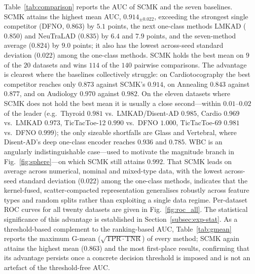 \documentclass[times, review, 10pt]{elsarticle}
\begin{document}
Table~\ref{tab:comparison} reports the AUC of SCMK and the seven baselines. SCMK
attains the highest mean AUC, $0.914_{\pm0.022}$, exceeding the strongest single
competitor (DFNO, $0.863$) by $5.1$ points, the next one-class
methods LMKAD ($0.850$) and NeuTraLAD ($0.835$) by $6.4$ and $7.9$ points, and the
seven-method average ($0.824$) by $9.0$ points; it also has the lowest
across-seed standard deviation ($0.022$) among the one-class methods. SCMK holds
the best mean on $9$ of the $20$ datasets and wins $114$ of the $140$ pairwise
comparisons. The advantage is clearest where the baselines collectively struggle:
on Cardiotocography the best competitor reaches only $0.873$ against SCMK's $0.914$,
on Annealing $0.843$ against $0.877$, and on Audiology $0.970$ against
$0.982$. On the eleven datasets where SCMK does not hold the best mean it is usually
a close second---within $0.01$--$0.02$ of the leader (e.g.\ Thyroid $0.981$ vs.\
LMKAD/Disent-AD $0.985$, Cardio $0.969$ vs.\ LMKAD $0.973$, TicTacToe-12 $0.990$
vs.\ DFNO $1.000$, TicTacToe-69 $0.981$ vs.\ DFNO $0.999$); the only sizeable
shortfalls are Glass and Vertebral, where
Disent-AD's deep one-class encoder reaches $0.936$ and $0.785$. WBC is an angularly
indistinguishable case---used to motivate the magnitude branch in
Fig.~\ref{fig:sphere}---on which SCMK still attains $0.992$.
That SCMK leads on average across numerical, nominal and mixed-type data, with the
lowest across-seed standard deviation ($0.022$) among the one-class methods,
indicates that the kernel-fused, scatter-compacted representation generalises
robustly across feature types and random splits rather than exploiting a single
data regime. Per-dataset ROC curves for all
twenty datasets are given in Fig.~\ref{fig:roc_all}. The statistical
significance of this advantage is established in Section~\ref{subsec:exp-stat}.
As a threshold-based complement to the ranking-based AUC, Table~\ref{tab:gmean}
reports the maximum G-mean ($\sqrt{\mathrm{TPR}\cdot\mathrm{TNR}}$) of every
method; SCMK again attains the highest mean ($0.863$) and the most first-place
results, confirming that its advantage persists once a concrete decision
threshold is imposed and is not an artefact of the threshold-free AUC.
\end{document}

